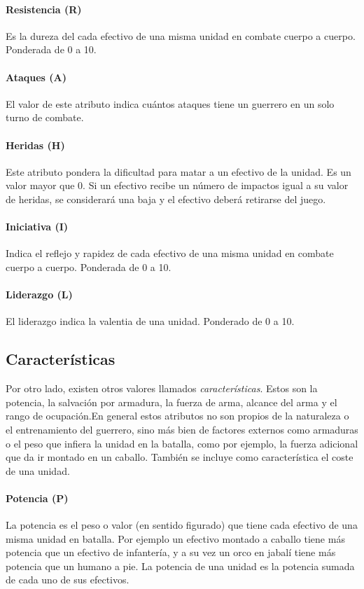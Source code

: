 \paragraph{Resistencia (R)}
Es la dureza del cada efectivo de una misma unidad en combate cuerpo a cuerpo. Ponderada de 0 a 10.

\paragraph{Ataques (A)}
El valor de este atributo indica cuántos ataques tiene un guerrero en
un solo turno de combate.

\paragraph{Heridas (H)}
Este atributo pondera la dificultad para matar a un efectivo de la
unidad. Es un valor mayor que 0. Si un efectivo recibe un número de
impactos igual a su valor de heridas, se considerará una baja y el
efectivo deberá retirarse del juego.

\paragraph{Iniciativa (I)}
Indica el reflejo y rapidez de cada efectivo de una misma unidad en combate cuerpo a cuerpo. Ponderada de 0 a 10.

\paragraph{Liderazgo (L)}
El liderazgo indica la valentia de una unidad. Ponderado de 0 a 10.

\subsection*{Características}
Por otro lado, existen otros valores llamados
\emph{características}. Estos son la potencia, la salvación por
armadura, la fuerza de arma, alcance del arma y el rango de ocupación.En general estos
atributos no son propios de la naturaleza o el entrenamiento del
guerrero, sino más bien de factores externos como armaduras o el peso
que infiera la unidad en la batalla, como por ejemplo, la fuerza
adicional que da ir montado en un caballo. También se incluye como
característica el coste de una unidad.

\paragraph{Potencia (P)}
La potencia es el peso o valor (en sentido figurado) que tiene cada
efectivo de una misma unidad en batalla. Por ejemplo un efectivo
montado a caballo tiene más potencia que un efectivo de infantería, y
a su vez un orco en jabalí tiene más potencia que un humano a pie. La
potencia de una unidad es la potencia sumada de cada uno de sus
efectivos.

